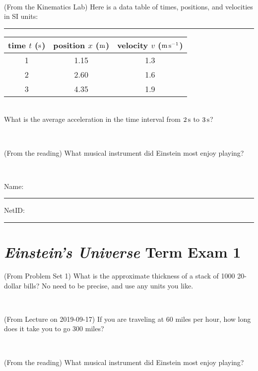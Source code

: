 \documentclass[12pt, letterpaper]{article}
\begin{document}
\vfill ~

\begin{problem} (From the Kinematics Lab)
Here is a data table of times, positions, and velocities in SI units:\\
\rule{1.0in}{0pt}\begin{tabular}{c|c|c}
time $t$ ($\mathrm{s}$) & position $x$ ($\mathrm{m}$) & velocity $v$ ($\mathrm{m}\,\mathrm{s}^{-1}$) \\
\hline
1 & 1.15 & 1.3 \\
2 & 2.60 & 1.6 \\
3 & 4.35 & 1.9 \\
\hline
\end{tabular}\\
What is the average acceleration in the time interval from $2\,\mathrm{s}$ to $3\,\mathrm{s}$?
\end{problem}


\vfill ~

\begin{problem} (From the reading)
What musical instrument did Einstein most enjoy playing?
\end{problem}


\vfill ~


\cleardoublepage



\noindent
Name: \rule[-1ex]{0.60\textwidth}{0.1pt}
NetID: \rule[-1ex]{0.20\textwidth}{0.1pt}

\section*{\textsl{Einstein's Universe} Term Exam 1}
\setcounter{problem}{1}


\begin{problem} (From Problem Set 1)
What is the approximate thickness of a stack of 1000 20-dollar bills?
No need to be precise, and use any units you like.
\end{problem}


\vfill ~

\begin{problem} (From Lecture on 2019-09-17)
If you are traveling at 60 miles per hour, how long does
it take you to go 300 miles?
\end{problem}


\vfill ~

\begin{problem} (From the reading)
What musical instrument did Einstein most enjoy playing?
\end{problem}
\end{document}
